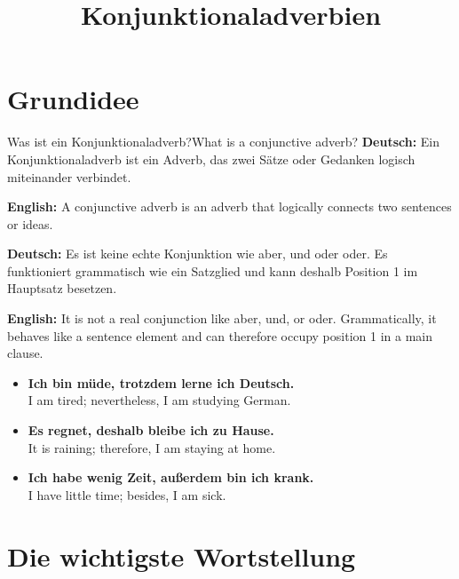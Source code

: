 \documentclass[a4paper,11pt]{article}
\title{Konjunktionaladverbien}
\date{}
\newcommand{\GermanText}[1]{\textbf{Deutsch: }#1\par}
\newcommand{\EnglishText}[1]{{\small\color{SoftGray}\textbf{English: }#1\par}}
\newcommand{\ExampleItem}[2]{\item \textbf{#1}\\{\small\color{SoftGray}#2}}
\begin{document}
    \maketitle
    \tableofcontents
    \newpage
    
    
    \section{Grundidee}
        
        \begin{grammarentry}{Was ist ein Konjunktionaladverb?}{What is a conjunctive adverb?}
            \GermanText{Ein Konjunktionaladverb ist ein Adverb, das zwei Sätze oder Gedanken logisch miteinander verbindet.}
            \EnglishText{A conjunctive adverb is an adverb that logically connects two sentences or ideas.}
            
            \GermanText{Es ist keine echte Konjunktion wie aber, und oder oder. Es funktioniert grammatisch wie ein Satzglied und kann deshalb Position 1 im Hauptsatz besetzen.}
            \EnglishText{It is not a real conjunction like aber, und, or oder. Grammatically, it behaves like a sentence element and can therefore occupy position 1 in a main clause.}
            
            \begin{exbox}
                \begin{itemize}
                    \ExampleItem{Ich bin müde, trotzdem lerne ich Deutsch.}{I am tired; nevertheless, I am studying German.}
                    \ExampleItem{Es regnet, deshalb bleibe ich zu Hause.}{It is raining; therefore, I am staying at home.}
                    \ExampleItem{Ich habe wenig Zeit, außerdem bin ich krank.}{I have little time; besides, I am sick.}
                \end{itemize}
            \end{exbox}
        \end{grammarentry}
    
    
    \section{Die wichtigste Wortstellung}
        
\end{document}
